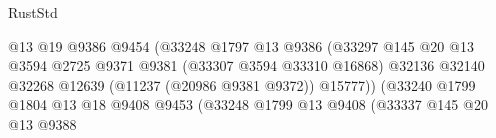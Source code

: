 \begin{lexlean}{RustStd}
\begin{coremodule}
                                                          @13
                                                          @19
                                                          @9386
                                                          @9454
                                                          (@33248
                                                            @1797
                                                            @13
                                                            @9386
                                                            (@33297
                                                              @145
                                                              @20
                                                              @13
                                                              @3594
                                                              @2725
                                                              @9371
                                                              @9381
                                                              (@33307 @3594 @33310 @16868)
                                                              @32136
                                                              @32140
                                                              @32268
                                                              @12639
                                                              (@11237 (@20986 @9381 @9372))
                                                              @15777))
                                                          (@33240
                                                            @1799
                                                            @1804
                                                            @13
                                                            @18
                                                            @9408
                                                            @9453
                                                            (@33248
                                                              @1799
                                                              @13
                                                              @9408
                                                              (@33337
                                                                @145
                                                                @20
                                                                @13
                                                                @9388

\end{coremodule}
\end{lexlean}
